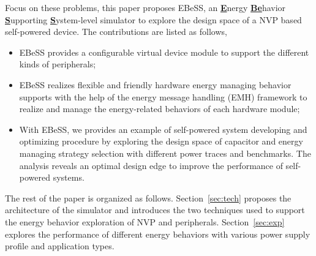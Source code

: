 %
Focus on these problems, this paper proposes EBeSS, an \underline{\textbf{E}}nergy \underline{\textbf{Be}}havior \underline{\textbf{S}}upporting \underline{\textbf{S}}ystem-level simulator to explore the design space of a NVP based self-powered device.
The contributions are listed as follows,
\begin{itemize}
	\item EBeSS provides a configurable virtual device module to support the different kinds of peripherals; 

     \item EBeSS realizes flexible and friendly hardware energy managing behavior supports with the help of the energy message handling (EMH) framework to realize and manage  the energy-related behaviors of each hardware module; 

	\item With EBeSS, we provides an example of self-powered system developing and optimizing procedure by exploring the design space of capacitor and energy managing strategy selection with different power traces and benchmarks. The analysis reveals an optimal design edge to improve the performance of self-powered systems.
\end{itemize}

The rest of the paper is organized as follows.
Section~\ref{sec:tech} proposes the architecture of the simulator and introduces the two techniques used to support the energy behavior exploration of NVP and peripherals.
Section~\ref{sec:exp} explores the performance of different energy behaviors with various power supply profile and application types.

\begin{comment}
  
  
\end{comment}